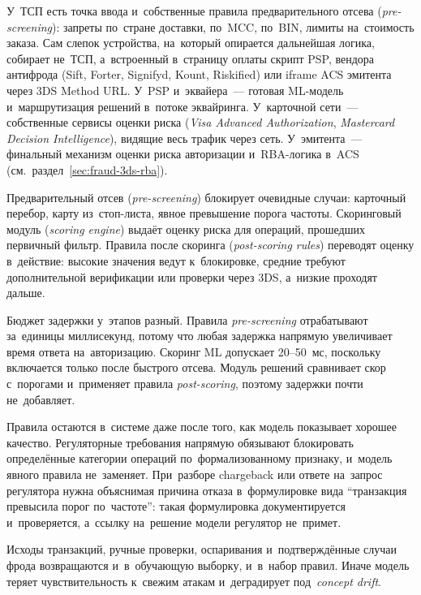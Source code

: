 У~ТСП есть точка ввода и~собственные правила предварительного отсева
(\textit{pre-screening}): запреты по~стране доставки, по~MCC, по~BIN, лимиты
на~стоимость заказа. Сам слепок устройства, на~который опирается дальнейшая
логика, собирает не~ТСП, а~встроенный в~страницу оплаты скрипт PSP, вендора антифрода
(Sift, Forter, Signifyd, Kount, Riskified) или iframe ACS эмитента через 3DS
Method URL. У~PSP и~эквайера~--- готовая ML-модель
и~маршрутизация решений в~потоке эквайринга. У~карточной сети~---
собственные сервисы оценки риска (\textit{Visa Advanced Authorization},
\textit{Mastercard Decision Intelligence}), видящие весь трафик через сеть.
У~эмитента~--- финальный механизм оценки риска авторизации и~RBA-логика в~ACS
(см.~раздел~\ref{sec:fraud-3ds-rba}).

Предварительный отсев (\textit{pre-screening}) блокирует очевидные случаи:
карточный перебор, карту из~стоп-листа, явное превышение порога частоты.
Скоринговый модуль (\textit{scoring engine}) выдаёт оценку риска для операций,
прошедших первичный фильтр. Правила после скоринга (\textit{post-scoring
rules}) переводят оценку в~действие: высокие значения ведут к~блокировке,
средние требуют дополнительной верификации или проверки через 3DS, а~низкие
проходят дальше.

Бюджет задержки у~этапов разный. Правила \textit{pre-screening} отрабатывают
за~единицы миллисекунд, потому что любая задержка напрямую увеличивает время
ответа на~авторизацию. Скоринг ML допускает 20--50~мс, поскольку включается
только после быстрого отсева. Модуль решений сравнивает скор с~порогами
и~применяет правила \textit{post-scoring}, поэтому задержки почти не~добавляет.

Правила остаются в~системе даже после того, как модель показывает хорошее
качество. Регуляторные требования напрямую обязывают блокировать определённые
категории операций по~формализованному признаку, и~модель явного правила
не~заменяет. При~разборе chargeback или ответе на~запрос регулятора
нужна объяснимая причина отказа в~формулировке вида \enquote{транзакция
превысила порог по~частоте}: такая формулировка документируется и~проверяется,
а~ссылку на~решение модели регулятор не~примет.

Исходы транзакций, ручные проверки, оспаривания и~подтверждённые случаи фрода
возвращаются и~в~обучающую выборку, и~в~набор правил. Иначе модель теряет
чувствительность к~свежим атакам и~деградирует под~\textit{concept drift}.

